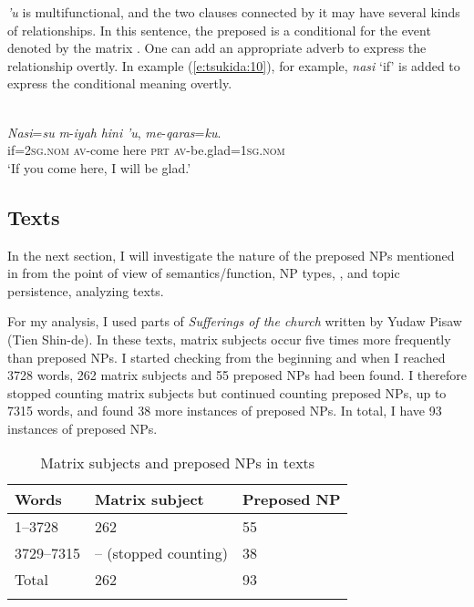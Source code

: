 \documentclass[output=paper
,modfonts
,nonflat]{langsci/langscibook}
\begin{document}
\noindent
\textit{'u} is multifunctional, and the two clauses connected by it may have several kinds of relationships. In this sentence, the preposed  is a conditional for the event denoted by the matrix . One can add an appropriate adverb to express the relationship overtly. In example (\ref{e:tsukida:10}), for example, \textit{nasi} ‘if’ is added to express the conditional meaning overtly.

\begin{exe}
	\label{e:tsukida:10}\\
	\gll \textit{Nasi}=\textit{su}  \textit{m}-\textit{iyah} \textit{hini} \textit{'u}, \textit{me}-\textit{qaras}=\textit{ku}.\\
	if=\textsc{2sg.nom}  \textsc{av}-come  here  \textsc{prt}  \textsc{av}-be.glad=\textsc{1sg}.\textsc{nom}\\
	\glt ‘If you come here, I will be glad.’
\end{exe}

\subsection{\label{s:tsukida:1.5}Texts}

In the next section, I will investigate the nature of the preposed NPs mentioned in  from the point of view of semantics/function, NP types, , and topic persistence, analyzing  texts. 

For my analysis, I used parts of \textit{Sufferings of the  church} written by Yudaw Pisaw (Tien Shin-de). In these texts, matrix  subjects occur five times more frequently than preposed NPs. I started checking from the beginning and when I reached 3728 words, 262 matrix  subjects and 55 preposed NPs had been found. I therefore stopped counting matrix  subjects but continued counting preposed NPs, up to 7315 words, and found 38 more instances of preposed NPs. In total, I have 93 instances of preposed NPs.

\begin{table}
	\begin{tabularx}{\textwidth}{XXl}
		\lsptoprule
		Words & Matrix subject & Preposed NP\\
		\midrule
		1--3728 & 262 &  55\\
		3729--7315 & -- (stopped counting) & 38\\
		\midrule
		Total & 262 &  93\\
		\lspbottomrule
	\end{tabularx}
	\caption{Matrix subjects and preposed NPs in texts}
	\label{tab:tsukida:1}
\end{table}
\end{document}
